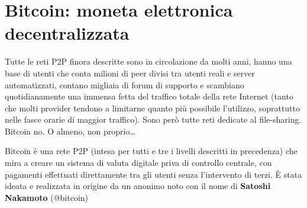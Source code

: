 \chapter{Bitcoin: moneta elettronica
decentralizzata}\label{bitcoin-moneta-elettronica-decentralizzata}

Tutte le reti P2P finora descritte sono in circolazione da molti anni,
hanno una base di utenti che conta milioni di peer divisi tra utenti
reali e server automatizzati, contano migliaia di forum di supporto e
scambiano quotidianamente una immensa fetta del traffico totale della
rete Internet (tanto che molti provider tendono a limitarne quanto più
possibile l'utilizzo, soprattutto nelle fasce orarie di maggior
traffico). Sono però tutte reti dedicate al file-sharing. Bitcoin no. O
almeno, non proprio\ldots{}

Bitcoin è una rete P2P (intesa per tutti e tre i livelli descritti in
precedenza) che mira a creare un sistema di valuta digitale priva di
controllo centrale, con pagamenti effettuati direttamente tra gli utenti
senza l'intervento di terzi. È stata ideata e realizzata in origine da
un anonimo noto con il nome di \textbf{Satoshi Nakamoto} (@bitcoin)
